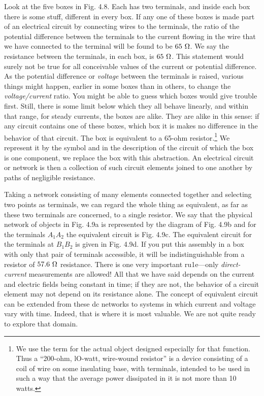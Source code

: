 Look at the five boxes in Fig. 4.8. Each has two terminals, and
inside each box there is some stuff, different in every box. If any one
of these boxes is made part of an electrical circuit by connecting wires
to the terminals, the ratio of the potential difference between the
terminals to the current flowing in the wire that we have connected
to the terminal will be found to be $65\ \ohmunit$. We say the resistance
between the terminals, in each box, is $65\ \ohmunit$. This statement
would surely not be true for all conceivable values of the current or
potential difference. As the potential difference or \emph{voltage} between
the terminals is raised, various things might happen, earlier in some
boxes than in others, to change the \emph{voltage/current} ratio. You might
be able to guess which boxes would give trouble first. Still, there is
some limit below which they all behave linearly, and within that
range, for steady currents, the boxes are alike. They are alike in this
sense: if any circuit contains one of these boxes, which box it is makes
no difference in the behavior of that circuit. The box is equivalent
to a 65-ohm resistor.\footnote{We use the term  for
the actual object designed especially for that function.
Thus a ``200-ohm, lO-watt, wire-wound resistor'' is a device consisting of a coil of wire
on some insulating base, with terminals, intended to be used in such a way that the average
power dissipated in it is not more than 10 watts.} We represent it by the symbol
and in the description of the circuit of which the box is one component,
we replace the box with this abstraction. An electrical circuit or
network is then a collection of such circuit elements joined to one
another by paths of negligible resistance.

Taking a network consisting of many elements connected together
and selecting two points as terminals, we can regard the whole thing
as equivalent, as far as these two terminals are concerned, to a single
resistor. We say that the physical network of objects in Fig. 4.9a is
represented by the diagram of Fig. 4.9b and for the terminals $A_1A_2$
the equivalent circuit is Fig. 4.9c. The equivalent circuit for the terminals
at $B_1B_2$ is given in Fig. 4.9d. If you put this assembly in a
box with only that pair of terminals accessible, it will be indistinguishable
from a resistor of $57.6\ \Omega$ resistance. There is one very
important ru1e---only \emph{direct-current} measurements are allowed! All
that we have said depends on the current and electric fields being
constant in time; if they are not, the behavior of a circuit element
may not depend on its resistance alone. The concept of equivalent
circuit can be extended from these dc networks to systems in which
current and voltage vary with time. Indeed, that is where it is most
valuable. We are not quite ready to explore that domain.

